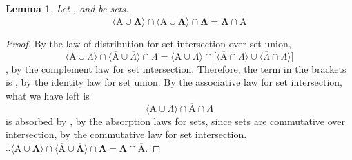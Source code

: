 \documentclass[preview]{standalone}
\newtheorem{lemma}{Lemma}
\begin{document}
\begin{lemma} %
    Let , and \bm{$\Lambda$} be sets.
    \begin{equation*}
        \bm{
            \Big \langle \mathrm{A} \cup \Lambda \Big \rangle
                \cap
            \Big \langle 
                \overline{\mathrm{A}} 
                    \cup 
                \overline{\Lambda} 
            \Big \rangle
                \cap
            \Lambda
                =
            \Lambda \cap \overline{\mathrm{A}}
        }
    \end{equation*}
\end{lemma}
\begin{proof}
    By the law of distribution for set intersection over set union,
    \begin{equation*}
        \Big \langle \mathrm{A} \cup \Lambda \Big \rangle
            \cap
        \Big \langle 
            \overline{\mathrm{A}} 
                \cup 
            \overline{\Lambda} 
        \Big \rangle
            \cap
        \Lambda
            =
        \Big \langle \mathrm{A} \cup \Lambda \Big \rangle
            \cap
        \bigg[
            \Big \langle \overline{\mathrm{A}} \cap \Lambda \Big \rangle
                \cup
            \Big \langle \overline{\Lambda} \cap \Lambda \Big \rangle
        \bigg]
    \end{equation*}
    \bm{$\overline{\Lambda} \cap \Lambda \equiv \varnothing$}, 
    by the complement law for set intersection. 
    Therefore, the term in the brackets is ,
    by the identity law for set union. By the associative law for set intersection, what we have left is
    \begin{equation*}
        \Big \langle \mathrm{A} \cup \Lambda \Big \rangle
            \cap
        \overline{\mathrm{A}}
            \cap
        \Lambda
    \end{equation*}
     is absorbed by \bm{$\Lambda$}, 
    by the absorption laws for sets, 
    since sets are commutative over intersection, 
    by the commutative law for set intersection.
    $\therefore \text{} \bm{
        \big \langle \mathrm{A} \cup \Lambda \big \rangle
            \cap
        \big \langle 
            \overline{\mathrm{A}} 
                \cup 
            \overline{\Lambda} 
        \big \rangle
            \cap
        \Lambda
            =
        \Lambda \cap \overline{\mathrm{A}}
    }$. 
\end{proof}
\end{document}

